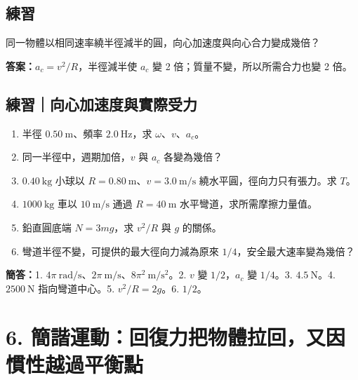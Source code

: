\documentclass[11pt,a4paper]{article}
\providecommand{\tightlist}{%
  \setlength{\itemsep}{0pt}\setlength{\parskip}{0pt}}
\begin{document}
\begin{HandoutSelfCheck}

\subsection{練習}\label{ux7df4ux7fd2-5}

同一物體以相同速率繞半徑減半的圓，向心加速度與向心合力變成幾倍？

\textbf{答案：}\(a_c=v^2/R\)，半徑減半使 \(a_c\) 變 2 倍；質量不變，所以所需合力也變 2 倍。

\end{HandoutSelfCheck}

\begin{HandoutSelfCheck}

\subsection{練習｜向心加速度與實際受力}\label{ux7df4ux7fd2ux5411ux5fc3ux52a0ux901fux5ea6ux8207ux5be6ux969bux53d7ux529b}

\begin{enumerate}
\def\labelenumi{\arabic{enumi}.}
\tightlist
\item
  半徑 \(0.50\ \mathrm m\)、頻率 \(2.0\ \mathrm{Hz}\)，求 \(\omega\)、\(v\)、\(a_c\)。
\item
  同一半徑中，週期加倍，\(v\) 與 \(a_c\) 各變為幾倍？
\item
  \(0.40\ \mathrm{kg}\) 小球以 \(R=0.80\ \mathrm m\)、\(v=3.0\ \mathrm{m/s}\) 繞水平圓，徑向力只有張力。求 \(T\)。
\item
  \(1000\ \mathrm{kg}\) 車以 \(10\ \mathrm{m/s}\) 通過 \(R=40\ \mathrm m\) 水平彎道，求所需摩擦力量值。
\item
  鉛直圓底端 \(N=3mg\)，求 \(v^2/R\) 與 \(g\) 的關係。
\item
  彎道半徑不變，可提供的最大徑向力減為原來 \(1/4\)，安全最大速率變為幾倍？
\end{enumerate}

\textbf{簡答：}1. \(4\pi\ \mathrm{rad/s}\)、\(2\pi\ \mathrm{m/s}\)、\(8\pi^2\ \mathrm{m/s^2}\)。2. \(v\) 變 \(1/2\)，\(a_c\) 變 \(1/4\)。3. \(4.5\ \mathrm N\)。4. \(2500\ \mathrm N\) 指向彎道中心。5. \(v^2/R=2g\)。6. \(1/2\)。

\end{HandoutSelfCheck}

\section{6. 簡諧運動：回復力把物體拉回，又因慣性越過平衡點}\label{ux7c21ux8ae7ux904bux52d5ux56deux5fa9ux529bux628aux7269ux9ad4ux62c9ux56deux53c8ux56e0ux6163ux6027ux8d8aux904eux5e73ux8861ux9ede}
\end{document}
